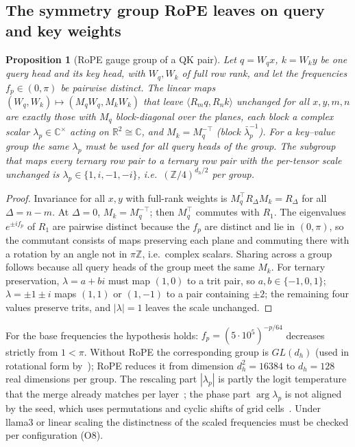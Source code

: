 \documentclass[10pt]{article}
\newtheorem{prop}[thm]{Proposition}
\theoremstyle{definition}
\newcommand{\R}{\mathbb R}\newcommand{\Z}{\mathbb Z}\newcommand{\C}{\mathbb C}
\begin{document}
\subsection{The symmetry group RoPE leaves on query and key weights}
\begin{prop}[RoPE gauge group of a QK pair]\label{p:qkgauge}
Let $q=W_qx$, $k=W_ky$ be one query head and its key head, with $W_q,W_k$ of full row rank, and let the frequencies $f_p\in(0,\pi)$ be pairwise distinct. The linear maps $(W_q,W_k)\mapsto(M_qW_q,M_kW_k)$ that leave $\langle R_mq,R_nk\rangle$ unchanged for all $x,y,m,n$ are exactly those with $M_q$ block-diagonal over the planes, each block a complex scalar $\lambda_p\in\C^\times$ acting on $\R^2\cong\C$, and $M_k=M_q^{-\top}$ (block $\bar\lambda_p^{-1}$). For a key--value group the same $\lambda_p$ must be used for all query heads of the group. The subgroup that maps every ternary row pair to a ternary row pair with the per-tensor scale unchanged is $\lambda_p\in\{1,i,-1,-i\}$, i.e.\ $(\Z/4)^{d_h/2}$ per group.
\end{prop}
\begin{proof}
Invariance for all $x,y$ with full-rank weights is $M_q^{\top}R_\Delta M_k=R_\Delta$ for all $\Delta=n-m$. At $\Delta=0$, $M_k=M_q^{-\top}$; then $M_q^{\top}$ commutes with $R_1$. The eigenvalues $e^{\pm if_p}$ of $R_1$ are pairwise distinct because the $f_p$ are distinct and lie in $(0,\pi)$, so the commutant consists of maps preserving each plane and commuting there with a rotation by an angle not in $\pi\Z$, i.e.\ complex scalars. Sharing across a group follows because all query heads of the group meet the same $M_k$. For ternary preservation, $\lambda=a+bi$ must map $(1,0)$ to a trit pair, so $a,b\in\{-1,0,1\}$; $\lambda=\pm1\pm i$ maps $(1,1)$ or $(1,-1)$ to a pair containing $\pm2$; the remaining four values preserve trits, and $|\lambda|=1$ leaves the scale unchanged.
\end{proof}
\noindent For the base frequencies the hypothesis holds: $f_p=(5\cdot10^5)^{-p/64}$ decreases strictly from $1<\pi$. Without RoPE the corresponding group is $GL(d_h)$ (used in rotational form by~\cite{zhangrot}); RoPE reduces it from dimension $d_h^2=16384$ to $d_h=128$ real dimensions per group. The rescaling part $|\lambda_p|$ is partly the logit temperature that the merge already matches per layer~\cite{arch}; the phase part $\arg\lambda_p$ is not aligned by the seed, which uses permutations and cyclic shifts of grid cells~\cite{pv2,arch}. Under llama3 or linear scaling the distinctness of the scaled frequencies must be checked per configuration (O8).
\end{document}
